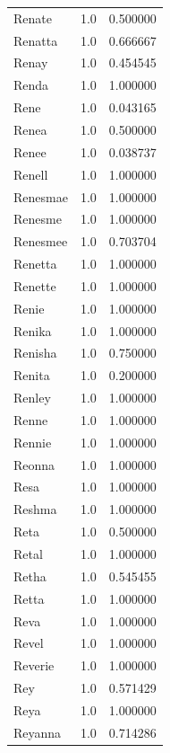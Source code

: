 \documentclass[
  letterpaper,
  DIV=11,
  numbers=noendperiod]{scrreprt}
\begin{document}
\begin{tabular}{lrr}
Renate          &   1.0 &   0.500000 \\
Renatta         &   1.0 &   0.666667 \\
Renay           &   1.0 &   0.454545 \\
Renda           &   1.0 &   1.000000 \\
Rene            &   1.0 &   0.043165 \\
Renea           &   1.0 &   0.500000 \\
Renee           &   1.0 &   0.038737 \\
Renell          &   1.0 &   1.000000 \\
Renesmae        &   1.0 &   1.000000 \\
Renesme         &   1.0 &   1.000000 \\
Renesmee        &   1.0 &   0.703704 \\
Renetta         &   1.0 &   1.000000 \\
Renette         &   1.0 &   1.000000 \\
Renie           &   1.0 &   1.000000 \\
Renika          &   1.0 &   1.000000 \\
Renisha         &   1.0 &   0.750000 \\
Renita          &   1.0 &   0.200000 \\
Renley          &   1.0 &   1.000000 \\
Renne           &   1.0 &   1.000000 \\
Rennie          &   1.0 &   1.000000 \\
Reonna          &   1.0 &   1.000000 \\
Resa            &   1.0 &   1.000000 \\
Reshma          &   1.0 &   1.000000 \\
Reta            &   1.0 &   0.500000 \\
Retal           &   1.0 &   1.000000 \\
Retha           &   1.0 &   0.545455 \\
Retta           &   1.0 &   1.000000 \\
Reva            &   1.0 &   1.000000 \\
Revel           &   1.0 &   1.000000 \\
Reverie         &   1.0 &   1.000000 \\
Rey             &   1.0 &   0.571429 \\
Reya            &   1.0 &   1.000000 \\
Reyanna         &   1.0 &   0.714286 \\

\end{tabular}
\end{document}
